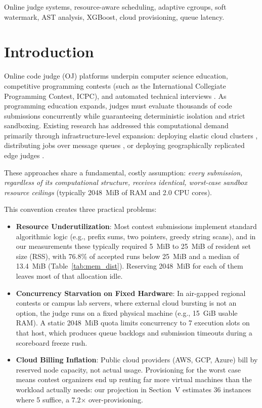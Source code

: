 \documentclass[conference]{IEEEtran}
\begin{document}
\begin{IEEEkeywords}
Online judge systems, resource-aware scheduling, adaptive cgroups, soft watermark, AST analysis, XGBoost, cloud provisioning, queue latency.
\end{IEEEkeywords}

\section{Introduction}
Online code judge (OJ) platforms underpin computer science education, competitive programming contests (such as the International Collegiate Programming Contest, ICPC), and automated technical interviews \cite{wasik2018survey}. As programming education expands, judges must evaluate thousands of code submissions concurrently while guaranteeing deterministic isolation and strict sandboxing. Existing research has addressed this computational demand primarily through infrastructure-level expansion: deploying elastic cloud clusters \cite{pan2022cloud}, distributing jobs over message queues \cite{song2025idl}, or deploying geographically replicated edge judges \cite{wang2021metaoj}.

These approaches share a fundamental, costly assumption: \textit{every submission, regardless of its computational structure, receives identical, worst-case sandbox resource ceilings} (typically 2048~MiB of RAM and 2.0 CPU cores).

This convention creates three practical problems:
\begin{itemize}
    \item \textbf{Resource Underutilization}: Most contest submissions implement standard algorithmic logic (e.g., prefix sums, two pointers, greedy string scans), and in our measurements these typically required 5~MiB to 25~MiB of resident set size (RSS), with 76.8\% of accepted runs below 25~MiB and a median of 13.4~MiB (Table~\ref{tab:mem_dist}). Reserving 2048~MiB for each of them leaves most of that allocation idle.
    \item \textbf{Concurrency Starvation on Fixed Hardware}: In air-gapped regional contests or campus lab servers, where external cloud bursting is not an option, the judge runs on a fixed physical machine (e.g., 15~GiB usable RAM). A static 2048~MiB quota limits concurrency to 7 execution slots on that host, which produces queue backlogs and submission timeouts during a scoreboard freeze rush.
    \item \textbf{Cloud Billing Inflation}: Public cloud providers (AWS, GCP, Azure) bill by reserved node capacity, not actual usage. Provisioning for the worst case means contest organizers end up renting far more virtual machines than the workload actually needs: our projection in Section~V estimates 36 instances where 5 suffice, a 7.2$\times$ over-provisioning.
\end{itemize}
\end{document}
